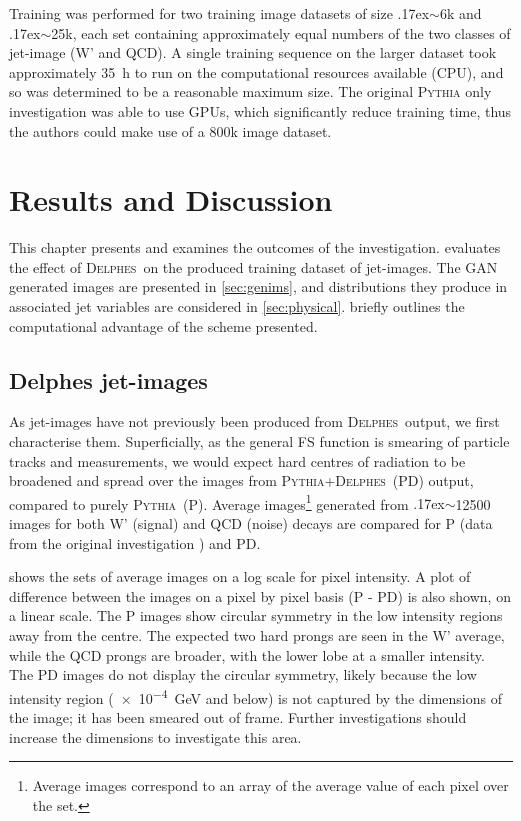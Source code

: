 \documentclass[twocolumn]{article}
\newcommand{\pkg}[1]{\textsc{#1}}
\newcommand{\pythia}{\pkg{Pythia}}
\newcommand{\delphes}{\pkg{Delphes}}
\newcommand{\around}{{\raise.17ex\hbox{$\scriptstyle\sim$}}}
\begin{document}
Training was performed for two training image datasets of size \around6k and \around25k, each set containing approximately equal numbers of the two classes of jet-image (W' and QCD). A single training sequence on the larger dataset took approximately \SI{35}{\hour} to run on the computational resources available (CPU), and so was determined to be a reasonable maximum size. The original \pkg{Pythia} only investigation was able to use GPUs, which significantly reduce training time, thus the authors could make use of a 800k image dataset.


\section{Results and Discussion}
\label{sec:results}

This chapter presents and examines the outcomes of the investigation.  evaluates the effect of \delphes~on the produced training dataset of jet-images. The GAN generated images are presented in \cref{sec:genims}, and distributions they produce in associated jet variables are considered in \cref{sec:physical}.  briefly outlines the computational advantage of the scheme presented.

\subsection{Delphes jet-images}
\label{sec:delphes-ims}

As jet-images have not previously been produced from \delphes~output, we first characterise them. Superficially, as the general FS function is smearing of particle tracks and measurements, we would expect hard centres of radiation to be broadened and spread over the images from \pythia+\delphes~(PD) output, compared to purely \pythia~(P). Average images\footnote{Average images correspond to an array of the average value of each pixel over the set.} generated from \around\num{12500} images for both W' (signal) and QCD (noise) decays are compared for P (data from the original investigation \cite{de2017learning}) and PD. 

 shows the sets of average images on a log scale for pixel intensity. A plot of difference between the images on a pixel by pixel basis (P - PD) is also shown, on a linear scale. The P images show circular symmetry in the low intensity regions away from the centre. The expected two hard prongs are seen in the W' average, while the QCD prongs are broader, with the lower lobe at a smaller intensity. The PD images do not display the circular symmetry, likely because the low intensity region (\SI{e-4}{\giga\electronvolt} and below) is not captured by the dimensions of the image; it has been smeared out of frame. Further investigations should increase the dimensions to investigate this area.
\end{document}
